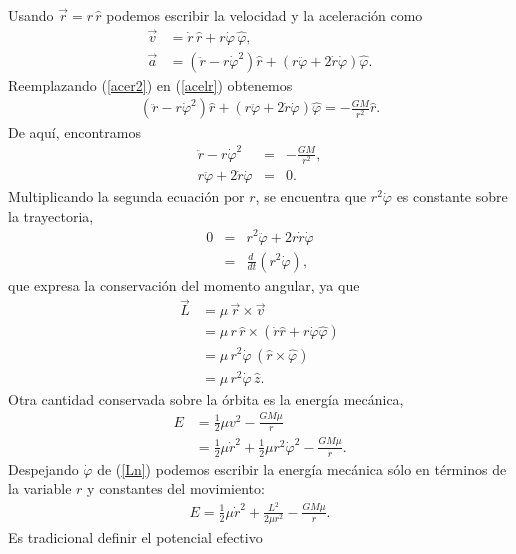 Usando $\vec{r}=r\,\hat{r}$ podemos escribir la velocidad y la aceleración como
\begin{align}
\vec{v} & = \dot{r}\,\hat{r}+r\dot{\varphi}\,\hat{\varphi} ,\label{vel1}\\
\vec{a} & = \left(\ddot{r}-r\dot{\varphi}^2\right)\hat{r} +\left(r\ddot{\varphi}+2\dot{r}\dot{\varphi}\right)\hat{\varphi} .\label{acer2}
\end{align}
Reemplazando (\ref{acer2}) en (\ref{acelr}) obtenemos
\begin{eqnarray}
\left(\ddot{r}-r\dot{\varphi}^2\right)\hat{r}+
\left(r\ddot{\varphi}+2\dot{r}\dot{\varphi}\right)\hat{\varphi}
=-\frac{GM}{r^2}\hat{r}.
\end{eqnarray}
De aquí, encontramos
\begin{eqnarray}
\ddot{r}-r\dot{\varphi}^2&=&-\frac{GM}{r^2},\label{acer3}\\
r\ddot{\varphi}+2\dot{r}\dot{\varphi}&=&0.\label{acer4}
\end{eqnarray}
Multiplicando la segunda ecuación por $r$, se encuentra que $r^2\dot{\varphi}$ es constante sobre la trayectoria,
\begin{eqnarray}
0&=&r^2\ddot{\varphi}+2r\dot{r}\dot{\varphi}\\
&=&\frac{d\ }{dt}\left(r^2\dot{\varphi}\right),
\end{eqnarray}
que expresa la conservación del momento angular, ya que
\begin{align}
\vec{L} & = \mu\,\vec{r}\times\vec{v}\\
& = \mu\,r\,\hat{r}\times\left(\dot{r}\hat{r}+r\dot{\varphi}\hat{\varphi}
\right)\\
& = \mu\,r^2\dot{\varphi}\,(\hat{r}\times\hat{\varphi})\\
& = \mu\,r^2\dot{\varphi}\,\hat{z}. \label{Ln}
\end{align}
Otra cantidad conservada sobre la órbita es la energía mecánica,
\begin{align}
E&=\frac{1}{2}\mu v^2-\frac{GM\mu}{r} \label{ener1}\\
&=\frac{1}{2}\mu\dot{r}^2+\frac{1}{2}\mu r^2\dot{\varphi}^2-\frac{GM\mu}{r}.\label{ener2}
\end{align}
Despejando $\dot{\varphi}$ de (\ref{Ln}) podemos escribir la energía mecánica sólo en términos de la variable $r$ y constantes del movimiento:
\begin{eqnarray}
E=\frac{1}{2}\mu\dot{r}^2+\frac{L^2}{2\mu r^2}-\frac{GM\mu}{r} .\label{ener3}
\end{eqnarray}
Es tradicional definir el potencial efectivo
